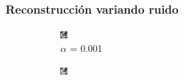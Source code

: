 \documentclass[11pt]{beamer}
\begin{document}
\begin{frame}
\frametitle{Reconstrucción variando ruido}

\begin{figure}[H]
    \centering
    \begin{subfigure}[h]{0.3\textwidth} 
        \includegraphics[width=\textwidth]{img/tomo_ruido001.png}
        \caption{$\alpha$ = 0.001}
        \label{fig: alpha = 0.001}
    \end{subfigure}%
    \hfill
    \begin{subfigure}[h]{0.30\textwidth}
        \includegraphics[width=\textwidth]{img/tomo_ruido005.png}

\end{subfigure}
\end{figure}
\end{frame}
\end{document}
